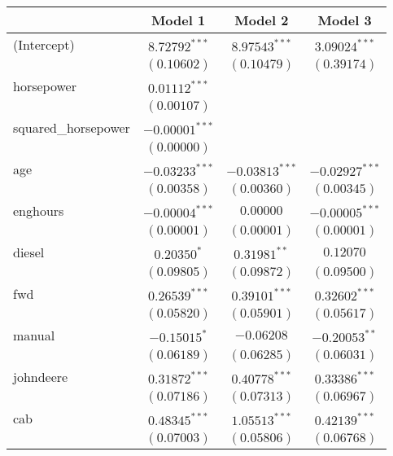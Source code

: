 
\begin{table}
\begin{center}
\begin{tabular}{l c c c}
\hline
 & Model 1 & Model 2 & Model 3 \\
\hline
(Intercept)         & $8.72792^{***}$  & $8.97543^{***}$  & $3.09024^{***}$  \\
                    & $(0.10602)$      & $(0.10479)$      & $(0.39174)$      \\
horsepower          & $0.01112^{***}$  &                  &                  \\
                    & $(0.00107)$      &                  &                  \\
squared\_horsepower & $-0.00001^{***}$ &                  &                  \\
                    & $(0.00000)$      &                  &                  \\
age                 & $-0.03233^{***}$ & $-0.03813^{***}$ & $-0.02927^{***}$ \\
                    & $(0.00358)$      & $(0.00360)$      & $(0.00345)$      \\
enghours            & $-0.00004^{***}$ & $0.00000$        & $-0.00005^{***}$ \\
                    & $(0.00001)$      & $(0.00001)$      & $(0.00001)$      \\
diesel              & $0.20350^{*}$    & $0.31981^{**}$   & $0.12070$        \\
                    & $(0.09805)$      & $(0.09872)$      & $(0.09500)$      \\
fwd                 & $0.26539^{***}$  & $0.39101^{***}$  & $0.32602^{***}$  \\
                    & $(0.05820)$      & $(0.05901)$      & $(0.05617)$      \\
manual              & $-0.15015^{*}$   & $-0.06208$       & $-0.20053^{**}$  \\
                    & $(0.06189)$      & $(0.06285)$      & $(0.06031)$      \\
johndeere           & $0.31872^{***}$  & $0.40778^{***}$  & $0.33386^{***}$  \\
                    & $(0.07186)$      & $(0.07313)$      & $(0.06967)$      \\
cab                 & $0.48345^{***}$  & $1.05513^{***}$  & $0.42139^{***}$  \\
                    & $(0.07003)$      & $(0.05806)$      & $(0.06768)$      \\

\end{tabular}
\end{center}
\end{table}
